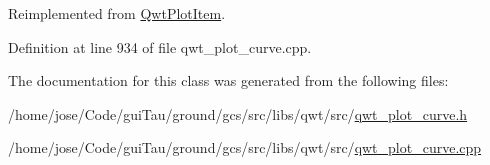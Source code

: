 Reimplemented from \hyperlink{class_qwt_plot_item_a193770cd20609a368c5130de59cb782e}{Qwt\-Plot\-Item}.



Definition at line 934 of file qwt\-\_\-plot\-\_\-curve.\-cpp.



The documentation for this class was generated from the following files\-:\begin{DoxyCompactItemize}
\item 
/home/jose/\-Code/gui\-Tau/ground/gcs/src/libs/qwt/src/\hyperlink{qwt__plot__curve_8h}{qwt\-\_\-plot\-\_\-curve.\-h}\item 
/home/jose/\-Code/gui\-Tau/ground/gcs/src/libs/qwt/src/\hyperlink{qwt__plot__curve_8cpp}{qwt\-\_\-plot\-\_\-curve.\-cpp}\end{DoxyCompactItemize}
